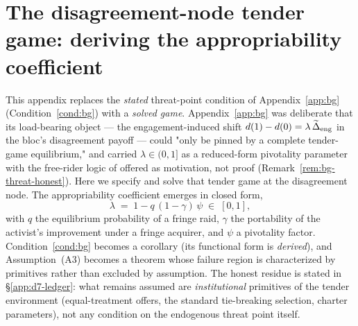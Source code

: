 
\providecommand{\Gbar}{\overline{G}}
\makeatletter
{}
\makeatother

\section{The disagreement-node tender game: deriving the appropriability coefficient}
\label{app:d7}

This appendix replaces the \emph{stated} threat-point condition of Appendix~\ref{app:bg} (Condition~\ref{cond:bg}) with a \emph{solved game}. Appendix~\ref{app:bg} was deliberate that its load-bearing object --- the engagement-induced shift $d(1)-d(0)=\lambda\,\widetilde{\Delta}_{\mathrm{eng}}$ in the bloc's disagreement payoff --- could "only be pinned by a complete tender-game equilibrium," and carried $\lambda\in(0,1]$ as a reduced-form pivotality parameter with the free-rider logic of \citet{GrossmanHart1980} offered as motivation, not proof (Remark~\ref{rem:bg-threat-honest}). Here we specify and solve that tender game at the disagreement node. The appropriability coefficient emerges in closed form,
\[
\lambda \;=\; 1-q\,(1-\gamma)\,\psi \;\in\;[0,1],
\]
with $q$ the equilibrium probability of a fringe raid, $\gamma$ the portability of the activist's improvement under a fringe acquirer, and $\psi$ a pivotality factor. Condition~\ref{cond:bg} becomes a corollary (its functional form is \emph{derived}), and Assumption~\textup{(A3)} becomes a theorem whose failure region is characterized by primitives rather than excluded by assumption. The honest residue is stated in \S\ref{app:d7-ledger}: what remains assumed are \emph{institutional} primitives of the tender environment (equal-treatment offers, the standard tie-breaking selection, charter parameters), not any condition on the endogenous threat point itself.

